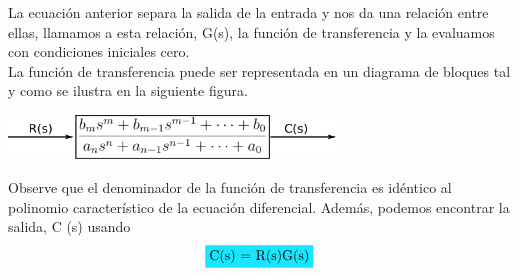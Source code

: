 La ecuación anterior separa la salida de la entrada y nos da una relación entre ellas, llamamos a esta relación, G(s), la función de
transferencia y la evaluamos con condiciones iniciales cero.\\
La función de transferencia puede ser representada en un diagrama de bloques tal y como se ilustra en la siguiente figura.
\begin{center}
	\includegraphics[width=0.65\textwidth]{Contenido/Cuerpo/Capitulo2/Fig24.eps}
	\label{fig:MarcoTeorico:Fig25}
\end{center}
Observe que el denominador de la función de transferencia es idéntico al polinomio característico de la ecuación diferencial. Además, podemos
encontrar la salida, C (s) usando
\begin{equation}
	\colorbox[rgb]{0.1,0.9,1}{C(s) = R(s)G(s)}
\end{equation}




